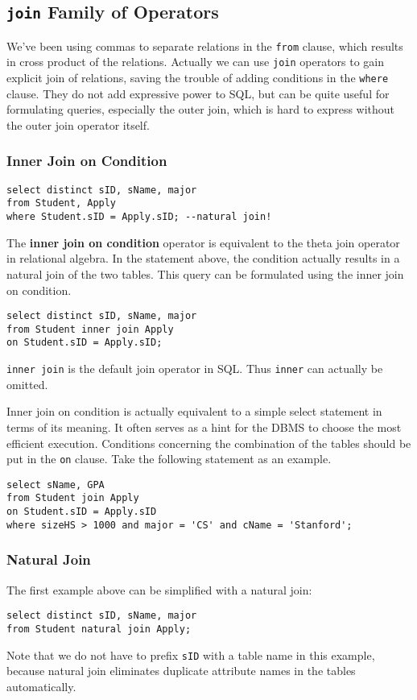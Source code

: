 \subsection{\texttt{join} Family of Operators}
We've been using commas to separate relations in the \texttt{from} clause, which results in cross product of the relations. Actually we can use \texttt{join} operators to gain explicit join of relations, saving the trouble of adding conditions in the \texttt{where} clause. They do not add expressive power to SQL, but can be quite useful for formulating queries, especially the outer join, which is hard to express without the outer join operator itself.
\subsubsection{Inner Join on Condition}
\begin{lstlisting}
select distinct sID, sName, major
from Student, Apply
where Student.sID = Apply.sID; --natural join!
\end{lstlisting}
The \textbf{inner join on condition} operator is equivalent to the theta join operator in relational algebra. In the statement above, the condition actually results in a natural join of the two tables. This query can be formulated using the inner join on condition.
\begin{lstlisting}
select distinct sID, sName, major
from Student inner join Apply
on Student.sID = Apply.sID;
\end{lstlisting}
\texttt{inner join} is the default join operator in SQL. Thus \texttt{inner} can actually be omitted.

Inner join on condition is actually equivalent to a simple select statement in terms of its meaning. It often serves as a hint for the DBMS to choose the most efficient execution. Conditions concerning the combination of the tables should be put in the \texttt{on} clause. Take the following statement as an example.
\begin{lstlisting}
select sName, GPA
from Student join Apply
on Student.sID = Apply.sID
where sizeHS > 1000 and major = 'CS' and cName = 'Stanford';
\end{lstlisting}
\subsubsection{Natural Join}
The first example above can be simplified with a natural join:
\begin{lstlisting}
select distinct sID, sName, major
from Student natural join Apply;
\end{lstlisting}
Note that we do not have to prefix \texttt{sID} with a table name in this example, because natural join eliminates duplicate attribute names in the tables automatically.
